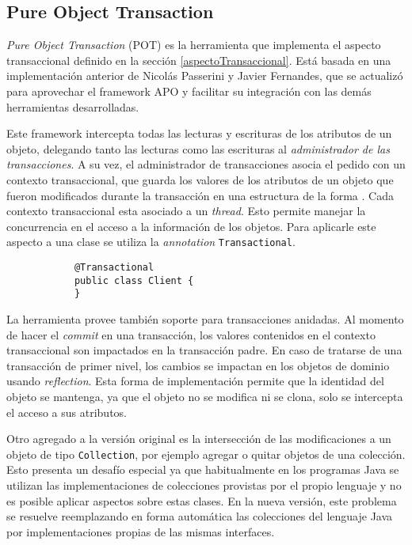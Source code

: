 \subsection{Pure Object Transaction}
	\label{pot} 
	\emph{Pure Object Transaction} (POT) es la herramienta que implementa el
	aspecto transaccional definido en la sección \ref{aspectoTransaccional}.
	Está basada en una implementación anterior de Nicolás Passerini y Javier
	Fernandes, que se actualizó para aprovechar el framework APO y facilitar su
	integración con las demás herramientas desarrolladas.
	
	\medskip
	 
	Este framework intercepta todas las lecturas y escrituras de los atributos de
	un objeto, delegando tanto las lecturas como las escrituras al
	\emph{administrador de las transacciones}.
	A su vez, el administrador de transacciones asocia el pedido con un contexto
	transaccional, que guarda los valores de los atributos de un objeto que fueron
	modificados durante la transacción en una estructura de la forma
	.
	Cada contexto transaccional esta asociado a un \emph{thread}. Esto
	permite manejar la concurrencia en el acceso a la información de los objetos.
	Para aplicarle este aspecto a una clase se utiliza la \emph{annotation}
	\lstinline|Transactional|.
		\begin{lstlisting} 
			@Transactional
			public class Client {
			}
		\end{lstlisting}
	\medskip
	 
	La herramienta provee también soporte para transacciones anidadas.
	Al momento de hacer el \emph{commit} en una transacción, los valores
	contenidos en el contexto transaccional son impactados en la transacción
	padre.
	En caso de tratarse de una transacción de primer nivel, los cambios se impactan
	en los objetos de dominio usando \emph{reflection}.
	Esta forma de implementación permite que la identidad del objeto se
	mantenga, ya que el objeto no se modifica ni se clona, solo se intercepta el
	acceso a sus atributos.
	
	Otro agregado a la versión original es la intersección de las modificaciones 
	a un objeto de tipo \lstinline|Collection|, por ejemplo agregar o quitar
	objetos de una colección.
	Esto presenta un desafío especial ya que habitualmente en los programas Java
	se utilizan las implementaciones de colecciones provistas por el propio
	lenguaje y no es posible aplicar aspectos sobre estas clases. 
	En la nueva versión, este problema se resuelve reemplazando en forma
	automática las colecciones del lenguaje Java por
	implementaciones propias de las mismas interfaces.
